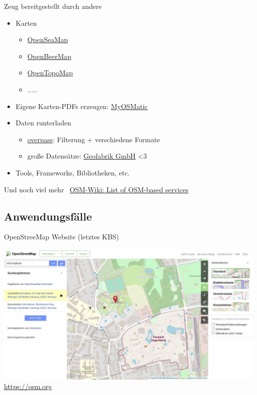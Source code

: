 \documentclass{beamer}
\begin{document}
			\begin{frame}{Zeug bereitgestellt durch andere}
				\begin{itemize}
					\item Karten
					\begin{itemize}
						\item \href{https://map.openseamap.org/?zoom=13.5\&lon=9.96566\&lat=53.52952}{OpenSeaMap}
						\item \href{https://openbeermap.github.io/\#17/53.54957/9.96370}{OpenBeerMap}
						\item \href{https://opentopomap.org}{OpenTopoMap}
						\item .....
					\end{itemize}\pause
					\item Eigene Karten-PDFs erzeugen: \href{https://print.get-map.org/}{MyOSMatic}\pause
					\item Daten runterladen
					\begin{itemize}
						\item \href{https://overpass-turbo.eu/}{overpass}: Filterung + verschiedene Formate
						\item große Datensätze: \href{http://download.geofabrik.de/}{Geofabrik GmbH} <3
					\end{itemize}\pause
					\item Tools, Frameworks, Bibliotheken, etc.
				\end{itemize}
				\pause
				\vspace{0.5cm}
				Und noch viel mehr \textrightarrow\ \href{https://wiki.openstreetmap.org/wiki/List\_of\_OSM-based\_services}{OSM-Wiki: List of OSM-based services}
			\end{frame}
			
		\subsection{Anwendungsfälle}
			
			\begin{frame}{OpenStreeMap Website (letztes KBS)}
				\begin{center}
					\includegraphics[height=0.7\textheight]{images/osm-website-old.jpg}\\
					\url{https://osm.org}
				\end{center}
			\end{frame}
			
\end{document}

